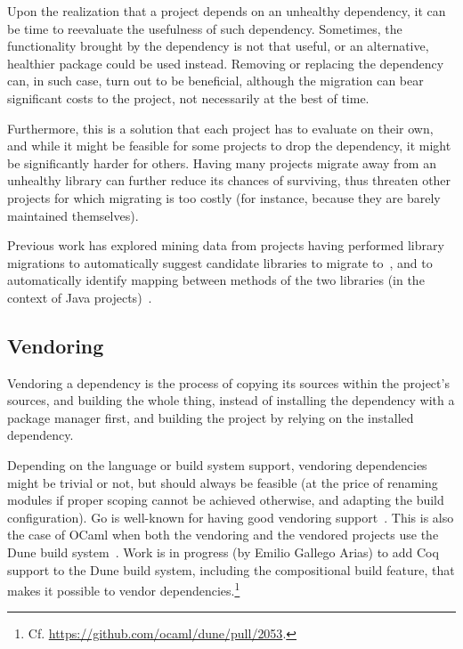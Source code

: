 Upon the realization that a project depends on an unhealthy
dependency, it can be time to reevaluate the usefulness of such
dependency.  Sometimes, the functionality brought by the dependency is
not that useful, or an alternative, healthier package could be used
instead.  Removing or replacing the dependency can, in such case, turn
out to be beneficial, although the migration can bear significant
costs to the project, not necessarily at the best of time.

Furthermore, this is a solution that each project has to evaluate on their own, and while it might be feasible for some projects to drop the dependency, it might be significantly harder for others.
Having many projects migrate away from an unhealthy library can further reduce its chances of surviving, thus threaten other projects for which migrating is too costly (for instance, because they are barely maintained themselves).

Previous work has explored mining data from projects having performed library migrations to automatically suggest candidate libraries to migrate to~\cite{teyton2012mining}, and to automatically identify mapping between methods of the two libraries (in the context of Java projects)~\cite{teyton2013automatic,alrubaye2019migration}.

\subsection{Vendoring}

Vendoring a dependency is the process of copying its sources within the project's sources, and building the whole thing, instead of installing the dependency with a package manager first, and building the project by relying on the installed dependency.

Depending on the language or build system support, vendoring dependencies
might be trivial or not, but should always be feasible (at the price
of renaming modules if proper scoping cannot be achieved otherwise, and adapting the build configuration).
Go is well-known for having good vendoring support~\cite{hightower2016s}.
This is also the case of OCaml when both the vendoring and the vendored projects use the Dune build system~\cite{dimino2016dune}.
Work is in progress (by Emilio Gallego Arias) to add Coq support to the Dune build system, including the compositional build feature, that makes it possible to vendor dependencies.\footnote{
	Cf. \url{https://github.com/ocaml/dune/pull/2053}.
}

